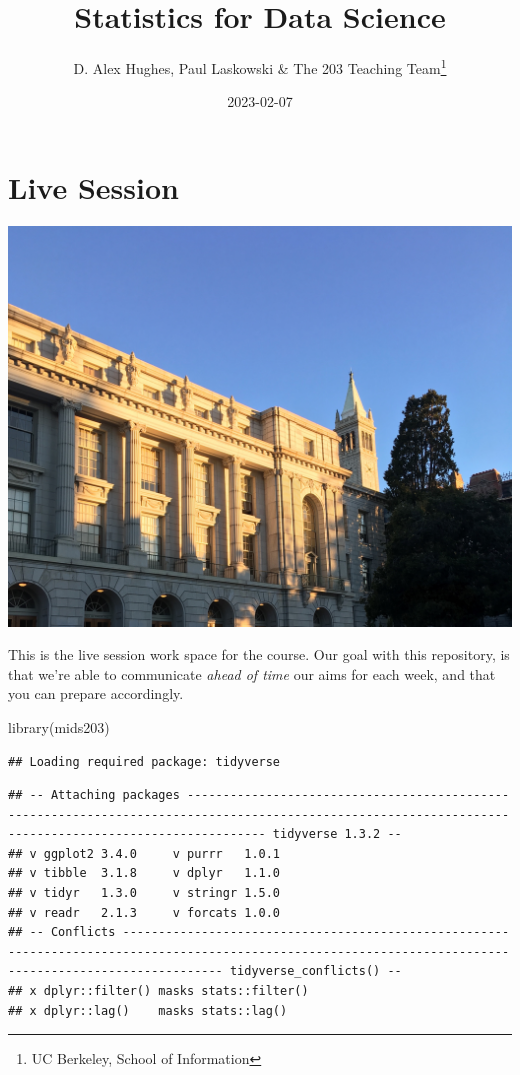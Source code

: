 \documentclass[
]{book}
\title{Statistics for Data Science}
\author{D. Alex Hughes, Paul Laskowski \& The 203 Teaching Team\footnote{UC Berkeley, School of Information}}
\date{2023-02-07}
\newenvironment{Shaded}{\begin{snugshade}}{\end{snugshade}}
\newcommand{\FunctionTok}[1]{\textcolor[rgb]{0.00,0.00,0.00}{#1}}
\newcommand{\NormalTok}[1]{#1}
\theoremstyle{definition}
\theoremstyle{definition}
\theoremstyle{definition}
\theoremstyle{definition}
\theoremstyle{remark}
\begin{document}
\maketitle

{
\setcounter{tocdepth}{1}
\tableofcontents
}
\hypertarget{live-session}{%
\chapter*{Live Session}\label{live-session}}

\includegraphics{./images/campus.jpeg}

This is the live session work space for the course. Our goal with this repository, is that we're able to communicate \emph{ahead of time} our aims for each week, and that you can prepare accordingly.

\begin{Shaded}
\begin{Highlighting}[]
\FunctionTok{library}\NormalTok{(mids203)}
\end{Highlighting}
\end{Shaded}

\begin{verbatim}
## Loading required package: tidyverse
\end{verbatim}

\begin{verbatim}
## -- Attaching packages ------------------------------------------------------------------------------------------------------------------------------------------------------- tidyverse 1.3.2 --
## v ggplot2 3.4.0     v purrr   1.0.1
## v tibble  3.1.8     v dplyr   1.1.0
## v tidyr   1.3.0     v stringr 1.5.0
## v readr   2.1.3     v forcats 1.0.0
## -- Conflicts ---------------------------------------------------------------------------------------------------------------------------------------------------------- tidyverse_conflicts() --
## x dplyr::filter() masks stats::filter()
## x dplyr::lag()    masks stats::lag()
\end{verbatim}
\end{document}
